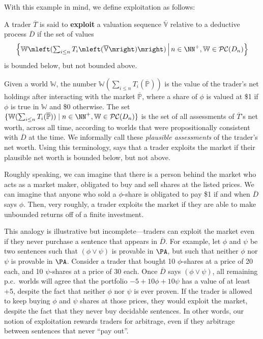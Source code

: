 \documentclass[authordate,onecolumn,noenvironments]{miri-tech-article}
\numberwithin{equation}{subsection}
\newcommand{\seq}[1]{{\overline{#1}}}
\newcommand{\nn}{n}
\newcommand{\trade}{T}%
\newcommand{\Trader}{\seq{\trade}} %
\newcommand{\BelState}{\mathbb{P}}
\newcommand{\Valuation}{\mathbb{V}}
\newcommand{\pt}{\BelState}
\newcommand{\MP}{\seq{\pt}}
\newcommand{\dt}{D}
\newcommand{\DP}{\seq{\dt}}
\newcommand{\pcworlds}{\mathcal{P\-C}}
\newcommand{\World}{\mathbb{W}}
\begin{document}
With this example in mind, we define exploitation as follows:
\begin{keydef}[Exploitation]\label{def:exploitation}
  A trader $\Trader$ is said to \textbf{exploit} a valuation sequence $\seq\Valuation$ relative to a deductive process $\DP$ if the set of values
  \[
    \left\{ \World\mleft({\textstyle \sum_{i \leq n} \trade_i\mleft(\seq\Valuation\mright)}\mright) \,\middle|\, \nn\in\NN^+, \World\in\pcworlds(\dt_\nn) \right\}
  \]
  is bounded below, but not bounded above.
\end{keydef}

Given a world $\World$, the number $\World(\sum_{i \leq \nn}\trade_i(\MP))$ is the value of the trader's net holdings after interacting with the market $\MP$, where a share of $\phi$ is valued at \$1 if $\phi$ is true in $\World$ and \$0 otherwise. The set $\{ \World(\sum_{i \leq n} \trade_i(\MP)) \mid \nn\in\NN^+, \World\in\pcworlds(\dt_\nn) \}$ is the set of all assessments of $\Trader$'s net worth, across all time, according to worlds that were propositionally consistent with $\DP$ at the time. We informally call these \emph{plausible assessments} of the trader's net worth. Using this terminology,  says that a trader exploits the market if their plausible net worth is bounded below, but not above.

Roughly speaking, we can imagine that there is a person behind the market who acts as a market maker, obligated to buy and sell shares at the listed prices. We can imagine that anyone who sold a $\phi$-share is obligated to pay \$1 if and when $\DP$ says $\phi$. Then, very roughly, a trader exploits the market if they are able to make unbounded returns off of a finite investment.

This analogy is illustrative but incomplete---traders can exploit the market even if they never purchase a sentence that appears in $\DP$. For example, let $\phi$ and $\psi$ be two sentences such that $(\phi \lor \psi)$ is provable in $\PA$, but such that neither $\phi$ nor $\psi$ is provable in $\PA$. Consider a trader that bought 10 $\phi$-shares at a price of 20\textcent{} each, and 10 $\psi$-shares at a price of 30\textcent{} each. Once $\DP$ says $(\phi\lor\psi)$, all remaining p.c.\ worlds will agree that the portfolio $-5 + 10\phi + 10\psi$ has a value of at least +5, despite the fact that neither $\phi$ nor $\psi$ is ever proven. If the trader is allowed to keep buying $\phi$ and $\psi$ shares at those prices, they would exploit the market, despite the fact that they never buy decidable sentences. In other words, our notion of exploitation rewards traders for arbitrage, even if they arbitrage between sentences that never ``pay out''.
\end{document}
